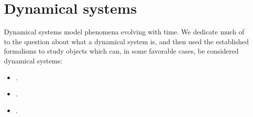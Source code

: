 \chapter{Dynamical systems}\label{ch:dynamical_systems}

Dynamical systems model phenomena evolving with time. We dedicate much of  to the question about what a dynamical system is, and then used the established formalisms to study objects which can, in some favorable cases, be considered dynamical systems:
\begin{itemize}
  \item {}.
  \item {}.
  \item {}.
\end{itemize}
